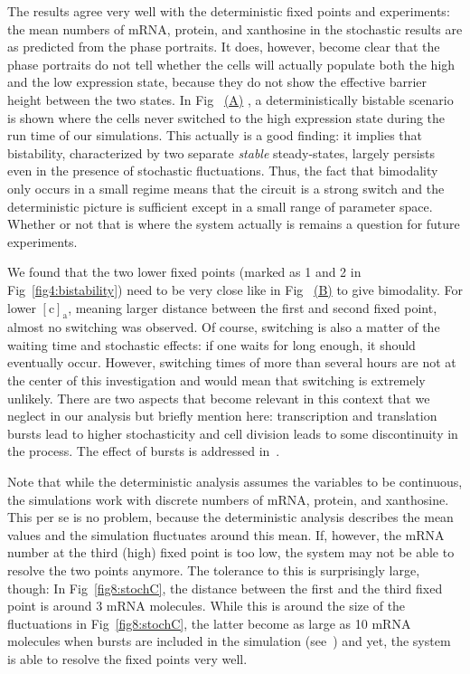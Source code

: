 \documentclass[10pt,letterpaper]{article}
\newcommand{\n}[1]{\mathrm{#1}}
\newcommand\subref[2]{%
	\def\myref{\getrefnumber{#1}}%
	\hyperref[#1]{\myref\mbox{#2}}%
}
\begin{document}
	The results agree very well with the deterministic fixed points and
	experiments: the mean numbers of mRNA, protein, and xanthosine in the
	stochastic results are as predicted from the phase portraits. It does,
	however, become clear that the phase portraits do not tell whether the cells
	will actually populate both the high and the low expression state,
	because they do not show the effective barrier height between the two states.
	In Fig~\subref{fig8:stochC}{(A)}, a deterministically bistable scenario is shown where the cells never switched to the high
	expression state during the run time of our simulations. This actually is a good finding: it implies that bistability, characterized by two separate \emph{stable} steady-states, largely persists even in the presence of stochastic fluctuations. Thus, the fact that bimodality only occurs in a small regime means that the circuit is a strong switch and the deterministic picture is sufficient except in a small range of parameter space. Whether or not that is where the system actually is remains a question for future experiments.
	
	We found that the two lower fixed points (marked as 1 and 2 in
	Fig~\ref{fig4:bistability}) need to be very close like in
	Fig~\subref{fig8:stochC}{(B)} to give bimodality. For lower $\n{[c]_a}$,
	meaning larger distance between the first and second fixed point,
	almost no switching was observed. Of course, switching is also a matter of the
	waiting time and stochastic effects: if one waits for long enough, it
	should eventually occur. However, switching times of more than several hours
	are not at the center of this investigation and would mean that switching is
	extremely unlikely. There are two aspects that become relevant in this
	context that we neglect in our analysis but briefly mention here:
	transcription and translation bursts lead to higher stochasticity and cell
	division leads to some discontinuity in the process. The effect of bursts is addressed in~.
	
	Note that while the deterministic analysis assumes the variables to be
	continuous, the simulations work with discrete numbers of mRNA, protein, and
	xanthosine. This per se is no problem, because the deterministic analysis
	describes the mean values and the simulation fluctuates around this mean.
	If, however, the mRNA number at the third (high) fixed point is too low, the
	system may not be able to resolve the two points anymore. The tolerance to this is surprisingly large, though: In Fig~\ref{fig8:stochC}, the distance between the first and the third fixed point is around 3 mRNA molecules. While this is around the size of the fluctuations in Fig~\ref{fig8:stochC}, the latter become as large as 10 mRNA molecules when bursts are included in the simulation (see~) and yet, the system is able to resolve the fixed points very well.
	
\end{document}
